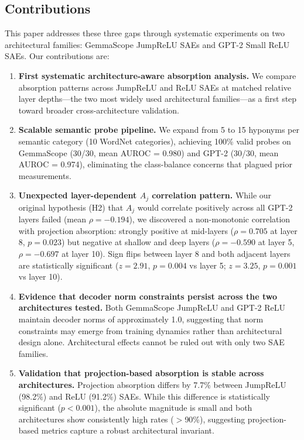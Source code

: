 \documentclass{article}
\begin{document}
\subsection{Contributions}

This paper addresses these three gaps through systematic experiments on two architectural families: GemmaScope JumpReLU SAEs and GPT-2 Small ReLU SAEs. Our contributions are:

\begin{enumerate}
    \item \textbf{First systematic architecture-aware absorption analysis.} We compare absorption patterns across JumpReLU and ReLU SAEs at matched relative layer depths---the two most widely used architectural families---as a first step toward broader cross-architecture validation.

    \item \textbf{Scalable semantic probe pipeline.} We expand from 5 to 15 hyponyms per semantic category (10 WordNet categories), achieving 100\% valid probes on GemmaScope (30/30, mean AUROC = 0.980) and GPT-2 (30/30, mean AUROC = 0.974), eliminating the class-balance concerns that plagued prior measurements.

    \item \textbf{Unexpected layer-dependent $A_j$ correlation pattern.} While our original hypothesis (H2) that $A_j$ would correlate positively across all GPT-2 layers failed (mean $\rho = -0.194$), we discovered a non-monotonic correlation with projection absorption: strongly positive at mid-layers ($\rho = 0.705$ at layer 8, $p = 0.023$) but negative at shallow and deep layers ($\rho = -0.590$ at layer 5, $\rho = -0.697$ at layer 10). Sign flips between layer 8 and both adjacent layers are statistically significant ($z = 2.91$, $p = 0.004$ vs layer 5; $z = 3.25$, $p = 0.001$ vs layer 10).

    \item \textbf{Evidence that decoder norm constraints persist across the two architectures tested.} Both GemmaScope JumpReLU and GPT-2 ReLU maintain decoder norms of approximately 1.0, suggesting that norm constraints may emerge from training dynamics rather than architectural design alone. Architectural effects cannot be ruled out with only two SAE families.

    \item \textbf{Validation that projection-based absorption is stable across architectures.} Projection absorption differs by 7.7\% between JumpReLU (98.2\%) and ReLU (91.2\%) SAEs. While this difference is statistically significant ($p < 0.001$), the absolute magnitude is small and both architectures show consistently high rates ($>$90\%), suggesting projection-based metrics capture a robust architectural invariant.
\end{enumerate}
\end{document}
